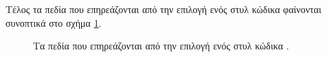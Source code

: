 \documentclass{assignment}
\begin{document}
Τέλος τα πεδία που επηρεάζονται από την επιλογή ενός στυλ κώδικα φαίνονται συνοπτικά στο σχήμα \ref{fig:style_quality}.
\begin{figure}
\begin{center}
\caption[Τα πεδία που επηρεάζονται από την επιλογή ενός στυλ κώδικα]{Τα πεδία που επηρεάζονται από την επιλογή ενός στυλ κώδικα \cite{ala2004supporting}. }
\label{fig:style_quality}
\end{center}
\end{figure}

\end{document}
